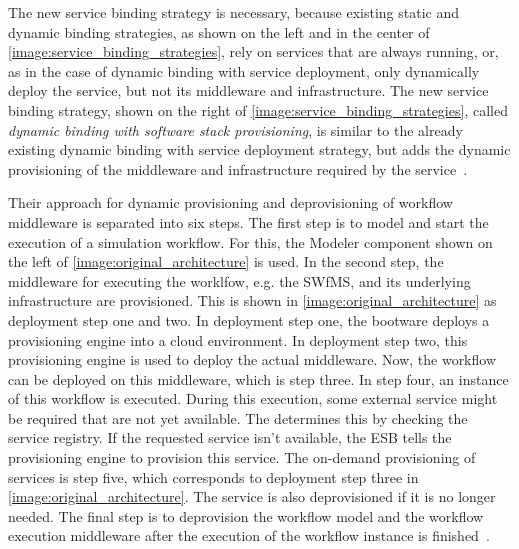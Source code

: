The new service binding strategy is necessary, because existing static and dynamic binding strategies, as shown on the left and in the center of \autoref{image:service_binding_strategies}, rely on services that are always running, or, as in the case of dynamic binding with service deployment, only dynamically deploy the service, but not its middleware and infrastructure.
The new service binding strategy, shown on the right of \autoref{image:service_binding_strategies}, called \textit{dynamic binding with software stack provisioning}, is similar to the already existing dynamic binding with service deployment strategy, but adds the dynamic provisioning of the middleware and infrastructure required by the service~\autocite{provisioning:ondemand}.

Their approach for dynamic provisioning and deprovisioning of workflow middleware is separated into six steps.
The first step is to model and start the execution of a simulation workflow.
For this, the Modeler component shown on the left of \autoref{image:original_architecture} is used.
In the second step, the middleware for executing the worklfow, e.g. the SWfMS, and its underlying infrastructure are provisioned.
This is shown in \autoref{image:original_architecture} as deployment step one and two.
In deployment step one, the bootware deploys a provisioning engine into a cloud environment.
In deployment step two, this provisioning engine is used to deploy the actual middleware.
Now, the workflow can be deployed on this middleware, which is step three.
In step four, an instance of this workflow is executed.
During this execution, some external service might be required that are not yet available.
The  determines this by checking the service registry.
If the requested service isn't available, the ESB tells the provisioning engine to provision this service.
The on-demand provisioning of services is step five, which corresponds to deployment step three in \autoref{image:original_architecture}.
The service is also deprovisioned if it is no longer needed.
The final step is to deprovision the workflow model and the workflow execution middleware after the execution of the workflow instance is finished~\autocite{provisioning:ondemand}.

